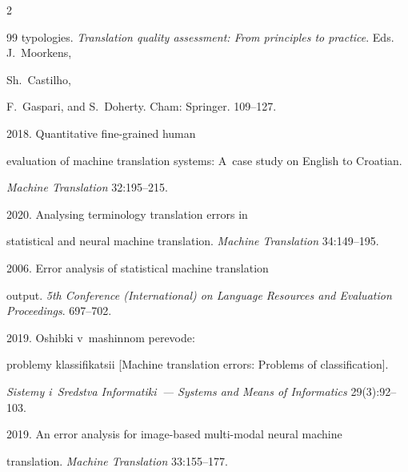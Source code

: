 \begin{multicols}{2}
{{\begin{thebibliography}{99}
typologies. \textit{Translation quality assessment: From principles to practice}. Eds. J.~Moorkens, 


Sh.~Castilho, 


F.~Gaspari, and S.~Doherty. Cham: Springer. 109--127.






 2018. Quantitative fine-grained human 


evaluation of machine translation systems: A~case study on English to Croatian. 


\textit{Machine Translation} 32:195--215.




 2020. Analysing terminology translation errors in 


statistical and neural machine translation. \textit{Machine Translation} 34:149--195.




 2006. Error analysis of statistical machine translation 


output. \textit{5th Conference (International) on Language Resources and Evaluation Proceedings}. 697--702. 




 2019. Oshibki v~mashinnom perevode: 


problemy klassifikatsii [Machine translation errors: Problems of classification]. 


\textit{Sistemy i~Sredstva  Informatiki~--- Systems and Means of Informatics} 29(3):92--103.




 2019. An error analysis for image-based multi-modal neural machine 


translation. \textit{Machine Translation} 33:155--177.


\end{thebibliography}





 }


 }





\end{multicols}





